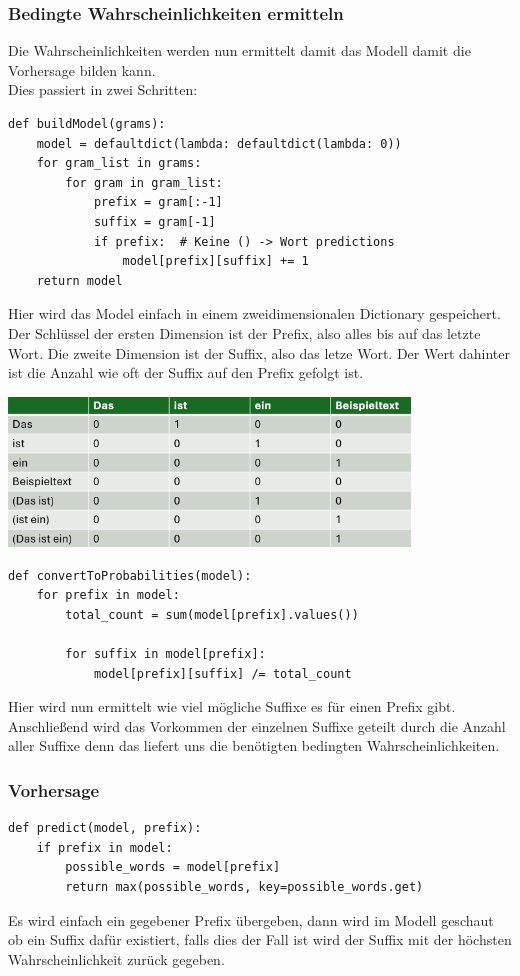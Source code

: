 \documentclass[12pt]{article}
\begin{document}
\subsubsection{Bedingte Wahrscheinlichkeiten ermitteln}
\quad Die Wahrscheinlichkeiten werden nun ermittelt damit das Modell damit die Vorhersage bilden kann.
\\Dies passiert in zwei Schritten:
\begin{lstlisting}
def buildModel(grams):
    model = defaultdict(lambda: defaultdict(lambda: 0))
    for gram_list in grams:
        for gram in gram_list:
            prefix = gram[:-1]
            suffix = gram[-1]
            if prefix:  # Keine () -> Wort predictions
                model[prefix][suffix] += 1
    return model
\end{lstlisting}
Hier wird das Model einfach in einem zweidimensionalen Dictionary gespeichert. Der Schlüssel der ersten Dimension ist der Prefix, also alles bis auf das letzte Wort. Die zweite Dimension ist der Suffix, also das letze Wort. Der Wert dahinter ist die Anzahl wie oft der Suffix auf den Prefix gefolgt ist.
\begin{center}
	\includegraphics[width=0.8\textwidth]{statics/Furitsch/table.PNG}
\end{center}
\begin{lstlisting}
def convertToProbabilities(model):
    for prefix in model:
        total_count = sum(model[prefix].values())

        for suffix in model[prefix]:
            model[prefix][suffix] /= total_count
\end{lstlisting}
Hier wird nun ermittelt wie viel mögliche Suffixe es für einen Prefix gibt. Anschließend wird das Vorkommen der einzelnen Suffixe geteilt durch die Anzahl aller Suffixe denn das liefert uns die benötigten bedingten Wahrscheinlichkeiten.
\subsubsection{Vorhersage}
\begin{lstlisting}
def predict(model, prefix):
    if prefix in model:
        possible_words = model[prefix]
        return max(possible_words, key=possible_words.get)
\end{lstlisting}
Es wird einfach ein gegebener Prefix übergeben, dann wird im Modell geschaut ob ein Suffix dafür existiert, falls dies der Fall ist wird der Suffix mit der höchsten Wahrscheinlichkeit zurück gegeben.
\end{document}
